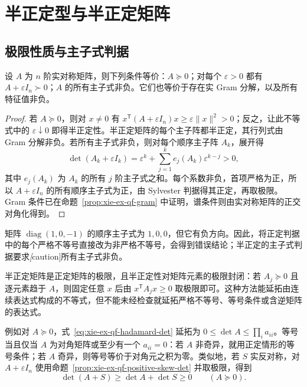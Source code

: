\section{半正定型与半正定矩阵}
\label{sec:xie-ex-qf-semidefinite}

\subsection{极限性质与主子式判据}

\begin{theorem}
\label{thm:xie-ex-qf-psd-minors}
设 $A$ 为 $n$ 阶实对称矩阵，则下列条件等价：$A\succeq0$；对每个 $\varepsilon>0$ 都有 $A+\varepsilon I_n\succ0$；$A$ 的所有主子式非负。它们也等价于存在实 Gram 分解，以及所有特征值非负。
\end{theorem}
\begin{proof}
若 $A\succeq0$，则对 $x\ne0$ 有 $x^{\mathsf T}(A+\varepsilon I_n)x\ge\varepsilon\|x\|^2>0$；反之，让此不等式中的 $\varepsilon\downarrow0$ 即得半正定性。半正定矩阵的每个主子阵都半正定，其行列式由 Gram 分解非负。若所有主子式非负，则对每个顺序主子阵 $A_k$，展开得
\[
 \det(A_k+\varepsilon I_k)
 =\varepsilon^k+\sum_{j=1}^k e_j(A_k)\varepsilon^{k-j}>0,
\]
其中 $e_j(A_k)$ 为 $A_k$ 的所有 $j$ 阶主子式之和。每个系数非负，首项严格为正，所以 $A+\varepsilon I_n$ 的所有顺序主子式为正，由 Sylvester 判据得其正定，再取极限。Gram 条件已在命题~\ref{prop:xie-ex-qf-gram} 中证明，谱条件则由实对称矩阵的正交对角化得到。
\end{proof}

\begin{notealert}[type=caution,title={顺序主子式的非负性不够}]
矩阵 $\operatorname{diag}(1,0,-1)$ 的顺序主子式为 $1,0,0$，但它有负方向。因此，将正定判据中的每个严格不等号直接改为非严格不等号，会得到错误结论；半正定的主子式判据要求\emph[caution]{所有主子式}非负。
\end{notealert}

半正定矩阵是正定矩阵的极限，且半正定性对矩阵元素的极限封闭：若 $A_j\succeq0$ 且逐元素趋于 $A$，则固定任意 $x$ 后由 $x^{\mathsf T}A_jx\ge0$ 取极限即可。这种方法能延拓由连续表达式构成的不等式，但不能未经检查就延拓严格不等号、等号条件或含逆矩阵的表达式。

例如对 $A\succeq0$，式~\eqref{eq:xie-ex-qf-hadamard-det} 延拓为 $0\le\det A\le\prod_i a_{ii}$。等号当且仅当 $A$ 为对角矩阵或至少有一个 $a_{ii}=0$：若 $A$ 非奇异，就用正定情形的等号条件；若 $A$ 奇异，则等号等价于对角元之积为零。类似地，若 $S$ 实反对称，对 $A+\varepsilon I_n$ 使用命题~\ref{prop:xie-ex-qf-positive-skew-det} 并取极限，得到
\begin{equation}
 \det(A+S)\ge\det A+\det S\ge0\qquad(A\succeq0).
 \label{eq:xie-ex-qf-psd-skew-det}
\end{equation}

